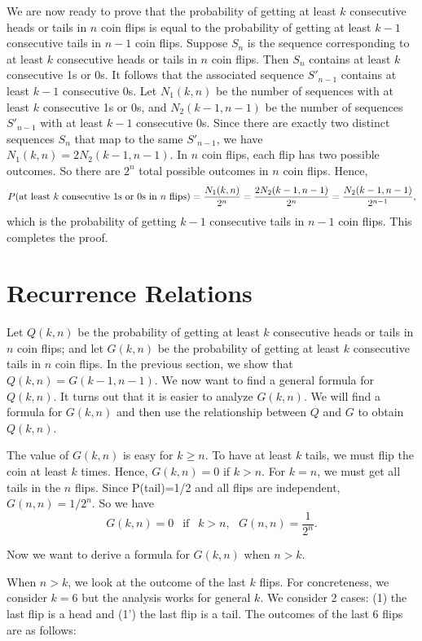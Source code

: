 \documentclass[11pt]{article}
\newcommand{\beq}{\begin{equation}}
\newcommand{\eeq}{\end{equation}}
\begin{document}
We are now ready to prove that the probability of getting at least $k$ consecutive heads or tails in 
$n$ coin flips is equal to the probability of getting at least $k-1$ consecutive tails in $n-1$ 
coin flips. Suppose $S_n$ is the sequence corresponding to at least $k$ consecutive heads or tails 
in $n$ coin flips. Then $S_n$ contains at least $k$ consecutive 1s or 0s. It follows that the associated 
sequence $S'_{n-1}$ contains at least $k-1$ consecutive 0s. Let $N_1(k,n)$ be the number of sequences 
with at least $k$ consecutive 1s or 0s, and $N_2(k-1,n-1)$ be the number of sequences $S'_{n-1}$ with 
at least $k-1$ consecutive 0s. Since there are exactly two distinct sequences $S_n$ that map to the same 
$S'_{n-1}$, we have $N_1(k,n)=2N_2(k-1,n-1)$. In $n$ coin flips, each flip has two possible outcomes. 
So there are $2^n$ total possible outcomes in $n$ coin flips. Hence, 
\beq
  P({\rm at~least}~k~{\rm consecutive~1s~or~0s~in}~n~{\rm flips})=\frac{N_1(k,n)}{2^n} = \frac{2N_2(k-1,n-1)}{2^n} 
= \frac{N_2(k-1,n-1)}{2^{n-1}}, 
\eeq
which is the probability of getting $k-1$ consecutive tails in $n-1$ coin flips. This completes the proof.

\section{Recurrence Relations}
\label{sec:recursion}

Let $Q(k,n)$ be the probability of getting at least $k$ consecutive heads or tails 
in $n$ coin flips; and let $G(k,n)$ be the probability of getting at least $k$ consecutive 
tails in $n$ coin flips. In the previous section, we show that $Q(k,n)=G(k-1,n-1)$. We now 
want to find a general formula for $Q(k,n)$. It turns out that it is easier to analyze $G(k,n)$. 
We will find a formula for $G(k,n)$ and then use the relationship between $Q$ and $G$ to 
obtain $Q(k,n)$.

The value of $G(k,n)$ is easy for $k \geq n$. To have at least $k$ tails, we must flip the coin 
at least $k$ times. Hence, $G(k,n)=0$ if $k>n$. For $k=n$, we must get all tails in the $n$ flips. 
Since P(tail)=1/2 and all flips are independent, $G(n,n)=1/2^n$. So we have 
\beq
  G(k,n) = 0 \ \ \mbox{ if } \ \ k>n, \ \ \ G(n,n)=\frac{1}{2^n} .
\label{eq:Gkn0}
\eeq

Now we want to derive a formula 
for $G(k,n)$ when $n >k$. 

When $n>k$, we look at the outcome of the last $k$ flips. For concreteness, we consider 
$k=6$ but the analysis works for general $k$. We consider 2 cases: 
(1) the last flip is a head and (1') the last flip 
is a tail. The outcomes of the last 6 flips are as follows:
\end{document}
